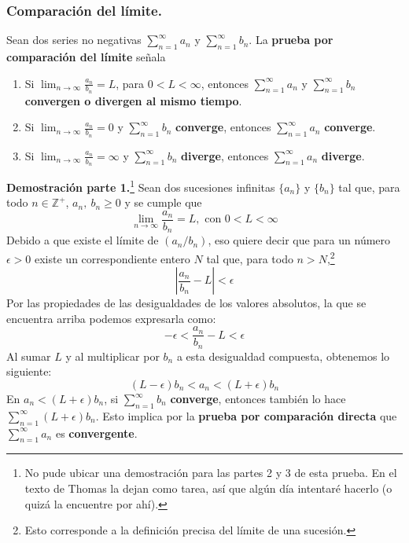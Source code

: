 \documentclass[12pt]{article}
\begin{document}
\subsubsection{Comparación del límite.}

Sean dos series no negativas $\sum_{n = 1}^{\infty} a_{n}$ y $\sum_{n = 1}^{\infty} b_{n}$. La \textbf{prueba por comparación del límite} señala

\begin{enumerate}
\item Si $\displaystyle \lim_{n \to \infty} \frac{a_{n}}{b_{n}} = L$, para $0 < L < \infty$, entonces $\sum_{n = 1}^{\infty} a_{n}$ y $\sum_{n = 1}^{\infty} b_{n}$ \textbf{convergen o divergen al mismo tiempo}.
\item Si $\displaystyle \lim_{n \to \infty} \frac{a_{n}}{b_{n}} = 0$ y $\sum_{n = 1}^{\infty} b_{n}$ \textbf{converge}, entonces $\sum_{n = 1}^{\infty} a_{n}$ \textbf{converge}.
\item Si $\displaystyle \lim_{n \to \infty} \frac{a_{n}}{b_{n}} = \infty$ y $\sum_{n = 1}^{\infty} b_{n}$ \textbf{diverge}, entonces $\sum_{n = 1}^{\infty} a_{n}$ \textbf{diverge}.
\end{enumerate}

\textbf{Demostración parte 1.}\footnote{No pude ubicar una demostración para las partes 2 y 3 de esta prueba. En el texto de Thomas la dejan como tarea, así que algún día intentaré hacerlo (o quizá la encuentre por ahí).} Sean dos sucesiones infinitas $\{a_{n}\}$ y $\{b_{n}\}$ tal que, para todo $n \in \mathbb{Z}^{+}$, $a_{n}, \ b_{n} \geq 0$ y se cumple que
\[
  \lim_{n \to \infty} \frac{a_{n}}{b_{n}} = L, \text{ con } 0 < L < \infty
\]
Debido a que existe el límite de $(a_{n}/b_{n})$, eso quiere decir que para un número $\epsilon > 0$ existe un correspondiente entero $N$ tal que, para todo $n > N$,\footnote{Esto corresponde a la definición precisa del límite de una sucesión.}
\[
  \left|\frac{a_{n}}{b_{n}} - L \right| < \epsilon
\]
Por las propiedades de las desigualdades de los valores absolutos, la que se encuentra arriba podemos expresarla como:
\[
  -\epsilon < \frac{a_{n}}{b_{n}} - L < \epsilon
\]
Al sumar $L$ y al multiplicar por $b_{n}$ a esta desigualdad compuesta, obtenemos lo siguiente:
\[
  (L - \epsilon) b_{n} < a_{n} < (L + \epsilon) b_{n}
\]
En $a_{n} < (L + \epsilon) b_{n}$, si $\sum_{n = 1}^{\infty} b_{n}$ \textbf{converge}, entonces también lo hace $\sum_{n = 1}^{\infty} (L + \epsilon) b_{n}$. Esto implica por la \textbf{prueba por comparación directa} que $\sum_{n = 1}^{\infty} a_{n}$ es \textbf{convergente}.
\end{document}
